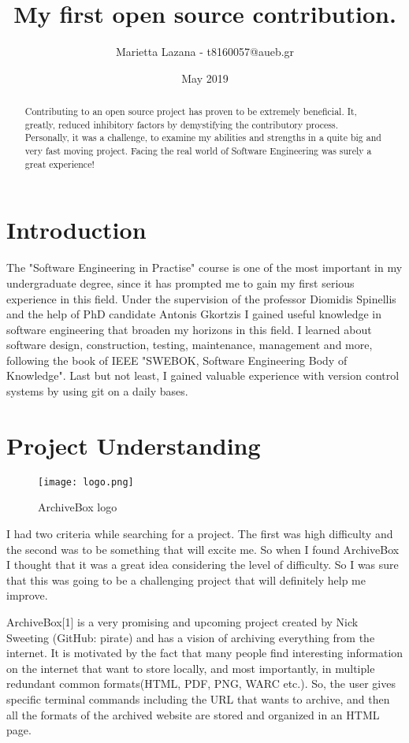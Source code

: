 \documentclass{article}
\title{My first open source contribution.}
\author{Marietta Lazana - t8160057@aueb.gr}
\date{May 2019}
\begin{document}
\maketitle

\begin{abstract}
Contributing to an open source project has proven to be extremely beneficial. It, greatly, reduced inhibitory factors by demystifying the contributory process. Personally, it was a challenge, to examine my abilities and strengths in a quite big and very fast moving project. Facing the real world of Software Engineering was surely a great experience!
  
\end{abstract}

\section*{Introduction}
The "Software Engineering in Practise" course is one of the most important in my undergraduate degree, since it has prompted me to gain my first serious experience in this field. Under the supervision of the professor Diomidis Spinellis and the help of PhD candidate Antonis Gkortzis I gained useful knowledge in software engineering that broaden my horizons in this field. I learned about software design, construction, testing, maintenance, management and more, following the book of IEEE "SWEBOK, Software Engineering  Body of Knowledge". Last but not least, I gained valuable experience with version control systems by using git on a daily bases.

\section{Project Understanding}

\begin{figure}[tph!]
\centerline{\texttt{[image: logo.png]}}
    \caption{ArchiveBox logo}
    \label{fig:verticalcell}
\end{figure}

I had two criteria while searching for a project. The first was high difficulty and the second was to be something that will excite me. So when I found ArchiveBox I thought that it was a great idea considering the level of difficulty. So I was sure that this was going to be a challenging project that will definitely help me improve.

ArchiveBox[1] is a very promising and upcoming project created by Nick Sweeting (GitHub: pirate) and has a vision of archiving everything from the internet. It is motivated by the fact that many people find interesting information on the internet that want to store locally, and most importantly, in multiple redundant common formats(HTML, PDF, PNG, WARC etc.). So, the user gives specific terminal commands including the URL that wants to archive, and then all the formats of the archived website are stored and organized in an HTML page.
\end{document}
